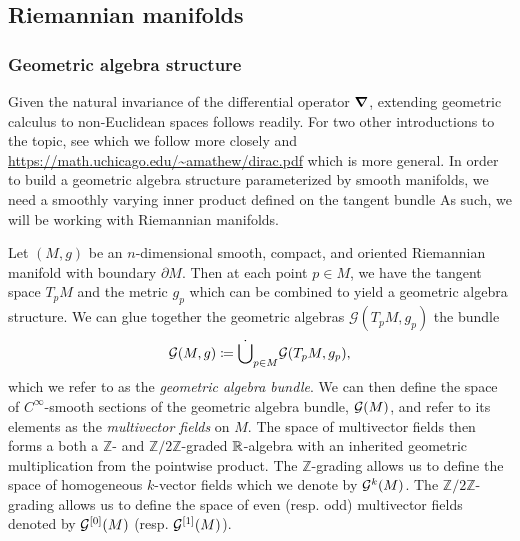 \documentclass[12pt]{article}
\begin{document}

\subsection{Riemannian manifolds}


\subsubsection{Geometric algebra structure}

Given the natural invariance of the differential operator $\boldsymbol{\nabla}$, extending geometric calculus to non-Euclidean spaces follows readily.  For two other introductions to the topic, see \cite{schindler_geometric_2020} which we follow more closely and \url{https://math.uchicago.edu/~amathew/dirac.pdf} which is more general. In order to build a geometric algebra structure parameterized by smooth manifolds, we need a smoothly varying inner product defined on the tangent bundle  As such, we will be working with Riemannian manifolds.

Let $(M,g)$ be an $n$-dimensional smooth, compact, and oriented Riemannian manifold with boundary $\partial M$.  Then at each point  $p\in M$, we have the tangent space $T_pM$ and the metric $g_p$ which can be combined to yield a geometric algebra structure. We can glue together the geometric algebras $\mathcal{G}(T_pM,g_p)$ the bundle
\[
\mathcal{G}(M,g) \coloneqq \dot{\bigcup}_{p\in M} \mathcal{G} (T_pM,g_p),
\]
which we refer to as the \emph{geometric algebra bundle}.  We can then define the space of $C^\infty$-smooth sections of the geometric algebra bundle, $\mathcal{G}(M)$, and refer to its elements as the \emph{multivector fields} on $M$. The space of multivector fields then forms a both a $\mathbb{Z}$- and $\mathbb{Z}/2\mathbb{Z}$-graded $\mathbb{R}$-algebra with an inherited geometric multiplication from the pointwise product. The $\mathbb{Z}$-grading allows us to define the space of homogeneous $k$-vector fields which we denote by $\mathcal{G}^{k}(M)$.  The $\mathbb{Z}/2\mathbb{Z}$-grading allows us to define the space of even (resp. odd) multivector fields denoted by $\mathcal{G}^{[0]}(M)$ (resp. $\mathcal{G}^{[1]}(M)$).
\end{document}
